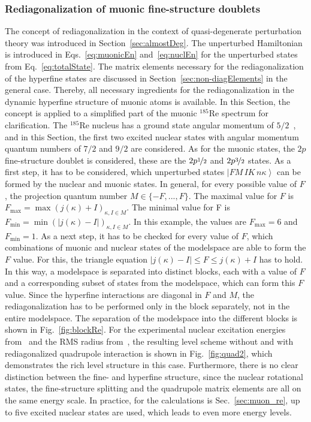 \subsubsection{Rediagonalization of muonic fine-structure doublets}
\label{sec:toyModelRediag}
The concept of rediagonalization in the context of quasi-degenerate perturbation theory was introduced in Section~\ref{sec:almostDeg}. The unperturbed Hamiltonian is introduced in Eqs.~\eqref{eq:muonicEn} and~\eqref{eq:nuclEn} for the unperturbed states from Eq.~\eqref{eq:totalState}. The matrix elements necessary for the rediagonalization of the hyperfine states are discussed in Section~\ref{sec:non-diagElements} in the general case. Thereby, all necessary ingredients for the rediagonalization in the dynamic hyperfine structure of muonic atoms is available. In this Section, the concept is applied to a simplified part of the muonic $^{185}$Re spectrum for clarification. The $^{185}$Re nucleus has a ground state angular momentum of $5/2$~\cite{Stone2005}, and in this Section, the first two excited nuclear states with angular momentum quantum numbers of $7/2$ and $9/2$ are considered. As for the muonic states, the $2p$ fine-structure doublet is considered, these are the $2p\nicefrac{1}{2}$ and $2p\nicefrac{3}{2}$ states.
As a first step, it has to be considered, which unperturbed states $\left|FM\,IK\,n\kappa\right>$ can be formed by the nuclear and muonic states. In general, for every possible value of $F$, the projection quantum number $M\in \{-F,...,F\}$. The maximal value for $F$ is $F_{\text{max}}=\max(j(\kappa)+I)_{\kappa, I \in M}$. The minimal value for F is $F_{\text{min}}=\min(|j(\kappa)-I|)_{\kappa, I \in M}$. In this example, the values are $F_{\text{max}}=6$ and $F_{\text{min}}=1$. As a next step, it has to be checked for every value of $F$, which combinations of muonic and nuclear states of the modelspace are able to form the $F$ value. For this, the triangle equation $|j(\kappa)-I|\leq F \leq j(\kappa)+I$ has to hold. In this way, a modelspace is separated into distinct blocks, each with a value of $F$ and a corresponding subset of states from the modelspace, which can form this $F$ value. Since the hyperfine interactions are diagonal in $F$ and $M$, the rediagonalization has to be performed only in the block separately, not in the entire modelspace. The separation of the modelspace into the different blocks is shown in Fig.~\ref{fig:blockRe}. For the experimental nuclear excitation energies from~\cite{ENSDF} and the RMS radius from~\cite{Angeli2013}, the resulting level scheme without and with rediagonalized quadrupole interaction is shown in Fig.~\ref{fig:quad2}, which demonstrates the rich level structure in this case. Furthermore, there is no clear distinction between the fine- and hyperfine structure, since the nuclear rotational states, the fine-structure splitting and the quadrupole matrix elements are all on the same energy scale. In practice, for the calculations is Sec.~\ref{sec:muon_re}, up to five excited nuclear states are used, which leads to even more energy levels.

